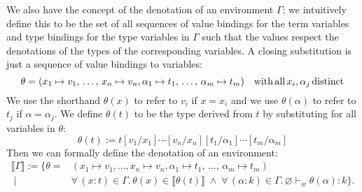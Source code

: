 \documentclass[11pt]{article}
\newcommand{\al}{\alpha}
\newcommand{\lb}{\llbracket}         %
\newcommand{\rb}{\rrbracket}         %
\begin{document}
We also have the concept of the denotation of an environment $\Gamma$; we intuitively define this to be the set of all sequences of value bindings for the term variables and type bindings for the type variables in $\Gamma$ such that the values respect the denotations of the types of the corresponding variables.
A closing substitution is just a sequence of value bindings to variables:
\[
\theta = (x_1\mapsto v_1,\,\ldots,\, x_n\mapsto v_n, \al_1 \mapsto t_1, \,\ldots,\, \al_m\mapsto t_m)
\quad {\rm with\, all}\, x_i, \al_j\, {\rm distinct}
\]
We use the shorthand $\theta(x)$ to refer to $v_i$ if $x = x_i$ and we use $\theta(\al)$ to refer to $t_j$ if $\al = \al_j$. We define $\theta(t)$ to be the type derived from $t$ by substituting for all variables in $\theta$:
\[
\theta(t) := t[v_1/x_1]\cdots[v_n/x_n][t_1/\al_1]\cdots[t_m/\al_m]
\]
Then we can formally define the denotation of an environment:
\begin{align*}
\lb \Gamma \rb := \{ \theta =& (x_1 \mapsto v_1,\ldots, x_n \mapsto v_n,  \al_1 \mapsto t_1, \,\ldots,\, \al_m\mapsto t_m) \\ \; | \;&
\forall\, (x:t) \in \Gamma.\, \theta(x) \in \lb\theta(t)\rb \;\wedge\;
\forall\, (\al:k) \in \Gamma.\, \varnothing \vdash_w \theta(\al) : k \}.
\end{align*}
\end{document}
